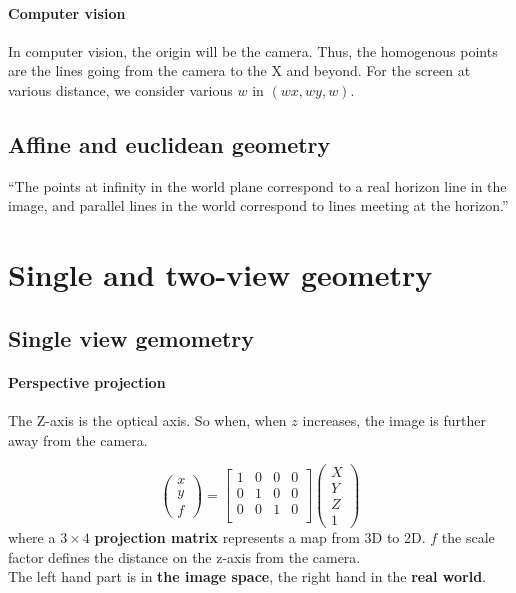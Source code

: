 \documentclass[../main.tex]{subfiles}
\begin{document}
\paragraph{Computer vision}
In computer vision, the origin will be the camera. Thus, the homogenous points are the lines going from the camera
to the X and beyond. For the screen at various distance, we consider various $w$ in $(wx, wy, w)$.


\subsection{Affine and euclidean geometry}
\begin{displayquote}
    \enquote{The points at infinity in the world plane correspond to a real horizon line in the image,
        and parallel lines in the world correspond to lines meeting at the horizon.}
\end{displayquote}





\section{Single and two-view geometry}
\subsection{Single view gemometry}
\paragraph{Perspective projection}
The Z-axis is the optical axis. So when, when $z$ increases, the image is further away from the camera.

\begin{equation}
    \begin{pmatrix} x \\ y \\ f \end{pmatrix}
    =
    \begin{bmatrix}
        1 & 0 & 0 & 0 \\
        0 & 1 & 0 & 0 \\
        0 & 0 & 1 & 0 \\
    \end{bmatrix}
    \begin{pmatrix} X \\ Y \\ Z \\ 1 \end{pmatrix}
\end{equation}
where a $3\times4$ \textbf{projection matrix} represents a map from 3D to 2D. $f$ the scale factor
defines the distance on the z-axis from the camera. \\
The left hand part is in \textbf{the image space}, the right hand in the \textbf{real world}.
\end{document}
